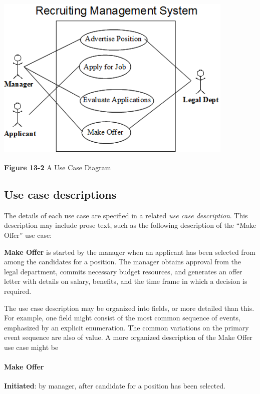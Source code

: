 \begin{center}
\includegraphics[width=4.5in,height=3.15in]{ub-img/usecase2.png}

{\sffamily\bfseries Figure 13-2}
{\sffamily A Use Case Diagram}
\end{center}

\subsection*{Use case descriptions}

The details of each use case are specified in a related \textit{use case
description}. This description may include prose text, such as the
following description of the ``Make Offer'' use case:

\textbf{Make Offer} is started by the manager when an applicant has been
selected from among the candidates for a position. The manager obtains
approval from the legal department, commits necessary budget resources,
and generates an offer letter with details on salary, benefits, and the
time frame in which a decision is required.

The use case description may be organized into fields, or more
detailed than this. For example, one field might consist of the
most common sequence of events, emphasized by an explicit enumeration.
The common variations on the primary event sequence are also of
value. A more organized description of the Make Offer use case might
be

\paragraph[Make Offer]{\bfseries Make Offer}
\textbf{Initiated}: by manager, after candidate for a position has been
selected.

